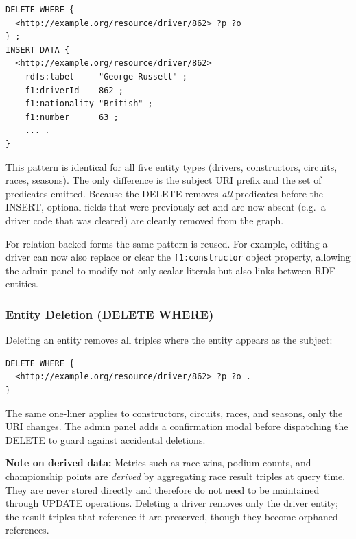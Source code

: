 \documentclass[12pt,a4paper]{article}
\begin{document}
\begin{lstlisting}[style=sparql, caption={DELETE + INSERT pattern for entity updates (identical structure for all entity types)}]
DELETE WHERE {
  <http://example.org/resource/driver/862> ?p ?o
} ;
INSERT DATA {
  <http://example.org/resource/driver/862>
    rdfs:label     "George Russell" ;
    f1:driverId    862 ;
    f1:nationality "British" ;
    f1:number      63 ;
    ... .
}
\end{lstlisting}

This pattern is identical for all five entity types (drivers, constructors,
circuits, races, seasons). The only difference is the subject URI prefix and
the set of predicates emitted. Because the DELETE removes \emph{all} predicates
before the INSERT, optional fields that were previously set and are now absent
(e.g.\ a driver code that was cleared) are cleanly removed from the graph.

For relation-backed forms the same pattern is reused. For example, editing a
driver can now also replace or clear the \texttt{f1:constructor} object
property, allowing the admin panel to modify not only scalar literals but also
links between RDF entities.

\subsubsection{Entity Deletion (DELETE WHERE)}

Deleting an entity removes all triples where the entity appears as the subject:

\begin{lstlisting}[style=sparql, caption={DELETE WHERE for entity removal}]
DELETE WHERE {
  <http://example.org/resource/driver/862> ?p ?o .
}
\end{lstlisting}

The same one-liner applies to constructors, circuits, races, and seasons,
only the URI changes. The admin panel adds a confirmation modal before
dispatching the DELETE to guard against accidental deletions.

\begin{infobox}
\textbf{Note on derived data:} Metrics such as race wins, podium counts, and
championship points are \emph{derived} by aggregating race result triples at
query time. They are never stored directly and therefore do not need to be
maintained through UPDATE operations. Deleting a driver removes only the driver
entity; the result triples that reference it are preserved, though they become
orphaned references.
\end{infobox}
\end{document}

